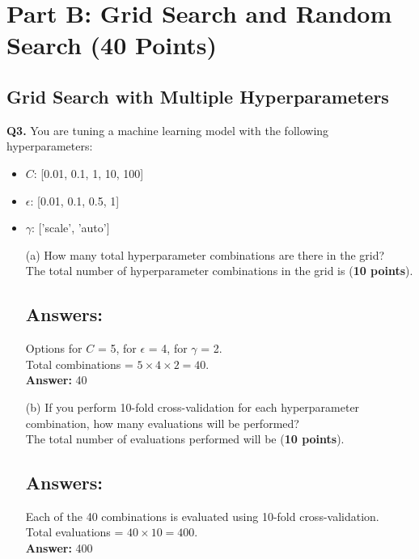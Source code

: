 \documentclass{article}
\begin{document}
\newpage
\section*{Part B: Grid Search and Random Search (40 Points)}
\subsection*{Grid Search with Multiple Hyperparameters}
\textbf{Q3.} You are tuning a machine learning model with the following
hyperparameters:
\begin{itemize}
      \item $C$: [0.01, 0.1, 1, 10, 100]
      \item $\epsilon$: [0.01, 0.1, 0.5, 1]
      \item $\gamma$: ['scale', 'auto']
\end{itemize}
\begin{enumerate}
      \item[(a)] How many total hyperparameter combinations are there in the grid? \\
            The total number of hyperparameter combinations in the grid is \underline{\hspace{3cm}} (\textbf{10 points}).
            \subsection*{Answers:}
            Options for $C$ = 5, for $\epsilon$ = 4, for $\gamma$ = 2. \\
            Total combinations = $5 \times 4 \times 2 = 40$. \\
            \textbf{Answer:} 40
      \item[(b)] If you perform 10-fold cross-validation for each hyperparameter
            combination, how many evaluations will be performed? \\
            The total number of evaluations performed will be \underline{\hspace{3cm}} (\textbf{10 points}).
            \subsection*{Answers:}
            Each of the 40 combinations is evaluated using 10-fold cross-validation. \\
            Total evaluations = $40 \times 10 = 400$. \\
            \textbf{Answer:} 400
\end{enumerate}
\newpage
\end{document}
